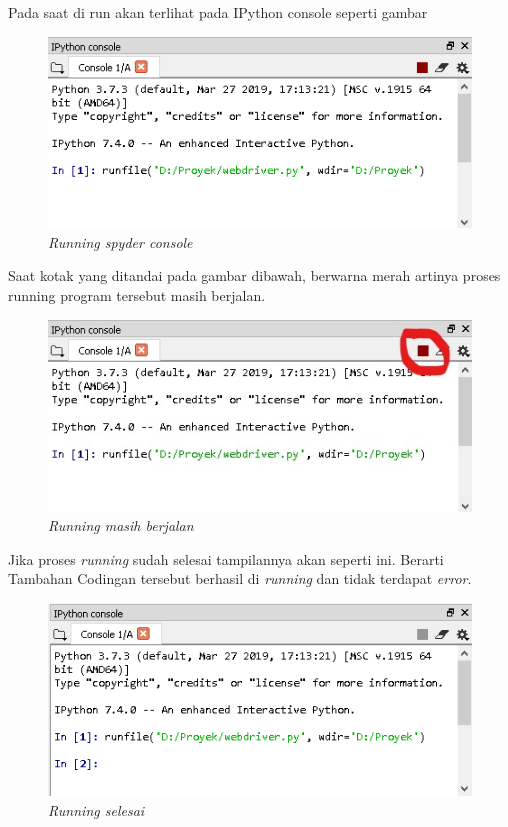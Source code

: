 \newpage

\item Pada saat di run akan terlihat pada IPython console seperti gambar 
\begin{figure}[H]
    	\centering
    	\includegraphics[scale=0.5]{figures/run2.png}
    	\caption{\textit{Running spyder console}}
    	\label{CLI}
	\end{figure}

\item Saat kotak yang ditandai pada gambar dibawah, berwarna merah artinya proses running program tersebut masih berjalan.
\begin{figure}[H]
    	\centering
    	\includegraphics[scale=0.5]{figures/run3.png}
    	\caption{\textit{Running masih berjalan}}
    	\label{CLI}
	\end{figure}

\item Jika proses \textit{running} sudah selesai tampilannya akan seperti ini. Berarti Tambahan Codingan tersebut berhasil di \textit{running} dan tidak terdapat \textit{error}.
\begin{figure}[H]
    	\centering
    	\includegraphics[scale=0.5]{figures/run4.png}
    	\caption{\textit{Running selesai}}
    	\label{CLI}
	\end{figure}


